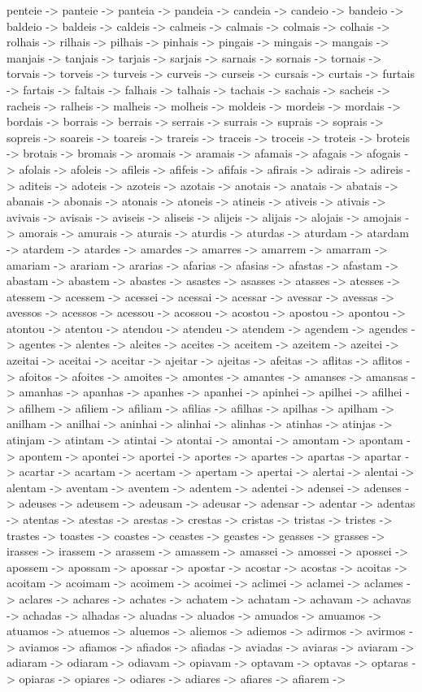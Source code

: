 \documentclass[a4paper,11pt]{article}
\begin{document}
penteie -> panteie -> panteia -> pandeia -> candeia -> candeio -> bandeio -> baldeio -> baldeis -> caldeis -> calmeis -> calmais -> colmais -> colhais -> rolhais -> rilhais -> pilhais -> pinhais -> pingais -> mingais -> mangais -> manjais -> tanjais -> tarjais -> sarjais -> sarnais -> sornais -> tornais -> torvais -> torveis -> turveis -> curveis -> curseis -> cursais -> curtais -> furtais -> fartais -> faltais -> falhais -> talhais -> tachais -> sachais -> sacheis -> racheis -> ralheis -> malheis -> molheis -> moldeis -> mordeis -> mordais -> bordais -> borrais -> berrais -> serrais -> surrais -> suprais -> soprais -> sopreis -> soareis -> toareis -> trareis -> traceis -> troceis -> troteis -> broteis -> brotais -> bromais -> aromais -> aramais -> afamais -> afagais -> afogais -> afolais -> afoleis -> afileis -> afifeis -> afifais -> afirais -> adirais -> adireis -> aditeis -> adoteis -> azoteis -> azotais -> anotais -> anatais -> abatais -> abanais -> abonais -> atonais -> atoneis -> atineis -> ativeis -> ativais -> avivais -> avisais -> aviseis -> aliseis -> alijeis -> alijais -> alojais -> amojais -> amorais -> amurais -> aturais -> aturdis -> aturdas -> aturdam -> atardam -> atardem -> atardes -> amardes -> amarres -> amarrem -> amarram -> amariam -> arariam -> ararias -> afarias -> afasias -> afastas -> afastam -> abastam -> abastem -> abastes -> asastes -> asasses -> atasses -> atesses -> atessem -> acessem -> acessei -> acessai -> acessar -> avessar -> avessas -> avessos -> acessos -> acessou -> acossou -> acostou -> apostou -> apontou -> atontou -> atentou -> atendou -> atendeu -> atendem -> agendem -> agendes -> agentes -> alentes -> aleites -> aceites -> aceitem -> azeitem -> azeitei -> azeitai -> aceitai -> aceitar -> ajeitar -> ajeitas -> afeitas -> aflitas -> aflitos -> afoitos -> afoites -> amoites -> amontes -> amantes -> amanses -> amansas -> amanhas -> apanhas -> apanhes -> apanhei -> apinhei -> apilhei -> afilhei -> afilhem -> afiliem -> afiliam -> afilias -> afilhas -> apilhas -> apilham -> anilham -> anilhai -> aninhai -> alinhai -> alinhas -> atinhas -> atinjas -> atinjam -> atintam -> atintai -> atontai -> amontai -> amontam -> apontam -> apontem -> apontei -> aportei -> aportes -> apartes -> apartas -> apartar -> acartar -> acartam -> acertam -> apertam -> apertai -> alertai -> alentai -> alentam -> aventam -> aventem -> adentem -> adentei -> adensei -> adenses -> adeuses -> adeusem -> adeusam -> adeusar -> adensar -> adentar -> adentas -> atentas -> atestas -> arestas -> crestas -> cristas -> tristas -> tristes -> trastes -> toastes -> coastes -> ceastes -> geastes -> geasses -> grasses -> irasses -> irassem -> arassem -> amassem -> amassei -> amossei -> apossei -> apossem -> apossam -> apossar -> apostar -> acostar -> acostas -> acoitas -> acoitam -> acoimam -> acoimem -> acoimei -> aclimei -> aclamei -> aclames -> aclares -> achares -> achates -> achatem -> achatam -> achavam -> achavas -> achadas -> alhadas -> aluadas -> aluados -> amuados -> amuamos -> atuamos -> atuemos -> aluemos -> aliemos -> adiemos -> adirmos -> avirmos -> aviamos -> afiamos -> afiados -> afiadas -> aviadas -> aviaras -> aviaram -> adiaram -> odiaram -> odiavam -> opiavam -> optavam -> optavas -> optaras -> opiaras -> opiares -> odiares -> adiares -> afiares -> afiarem -> 
\end{document}
